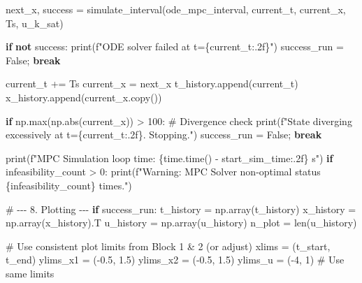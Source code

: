 \documentclass[
  letterpaper,
  DIV=11,
  numbers=noendperiod,
  oneside]{scrartcl}
\newenvironment{Shaded}{\begin{snugshade}}{\end{snugshade}}
\newcommand{\BuiltInTok}[1]{\textcolor[rgb]{0.00,0.23,0.31}{#1}}
\newcommand{\CommentTok}[1]{\textcolor[rgb]{0.37,0.37,0.37}{#1}}
\newcommand{\ControlFlowTok}[1]{\textcolor[rgb]{0.00,0.23,0.31}{\textbf{#1}}}
\newcommand{\DecValTok}[1]{\textcolor[rgb]{0.68,0.00,0.00}{#1}}
\newcommand{\FloatTok}[1]{\textcolor[rgb]{0.68,0.00,0.00}{#1}}
\newcommand{\KeywordTok}[1]{\textcolor[rgb]{0.00,0.23,0.31}{\textbf{#1}}}
\newcommand{\NormalTok}[1]{\textcolor[rgb]{0.00,0.23,0.31}{#1}}
\newcommand{\OperatorTok}[1]{\textcolor[rgb]{0.37,0.37,0.37}{#1}}
\newcommand{\SpecialCharTok}[1]{\textcolor[rgb]{0.37,0.37,0.37}{#1}}
\newcommand{\SpecialStringTok}[1]{\textcolor[rgb]{0.13,0.47,0.30}{#1}}
\newcommand{\VariableTok}[1]{\textcolor[rgb]{0.07,0.07,0.07}{#1}}
\begin{document}
\begin{Shaded}
\begin{Highlighting}[numbers=left,,]
\NormalTok{    next\_x, success }\OperatorTok{=}\NormalTok{ simulate\_interval(ode\_mpc\_interval, current\_t, current\_x, Ts, u\_k\_sat)}

    \ControlFlowTok{if} \KeywordTok{not}\NormalTok{ success:}
        \BuiltInTok{print}\NormalTok{(}\SpecialStringTok{f"ODE solver failed at t=}\SpecialCharTok{\{}\NormalTok{current\_t}\SpecialCharTok{:.2f\}}\SpecialStringTok{"}\NormalTok{)}
\NormalTok{        success\_run }\OperatorTok{=} \VariableTok{False}\OperatorTok{;} \ControlFlowTok{break}

\NormalTok{    current\_t }\OperatorTok{+=}\NormalTok{ Ts}
\NormalTok{    current\_x }\OperatorTok{=}\NormalTok{ next\_x}
\NormalTok{    t\_history.append(current\_t)}
\NormalTok{    x\_history.append(current\_x.copy())}

    \ControlFlowTok{if}\NormalTok{ np.}\BuiltInTok{max}\NormalTok{(np.}\BuiltInTok{abs}\NormalTok{(current\_x)) }\OperatorTok{\textgreater{}} \DecValTok{100}\NormalTok{: }\CommentTok{\# Divergence check}
        \BuiltInTok{print}\NormalTok{(}\SpecialStringTok{f"State diverging excessively at t=}\SpecialCharTok{\{}\NormalTok{current\_t}\SpecialCharTok{:.2f\}}\SpecialStringTok{. Stopping."}\NormalTok{)}
\NormalTok{        success\_run }\OperatorTok{=} \VariableTok{False}\OperatorTok{;} \ControlFlowTok{break}

\BuiltInTok{print}\NormalTok{(}\SpecialStringTok{f"MPC Simulation loop time: }\SpecialCharTok{\{}\NormalTok{time}\SpecialCharTok{.}\NormalTok{time() }\OperatorTok{{-}}\NormalTok{ start\_sim\_time}\SpecialCharTok{:.2f\}}\SpecialStringTok{ s"}\NormalTok{)}
\ControlFlowTok{if}\NormalTok{ infeasibility\_count }\OperatorTok{\textgreater{}} \DecValTok{0}\NormalTok{: }\BuiltInTok{print}\NormalTok{(}\SpecialStringTok{f"Warning: MPC Solver non{-}optimal status }\SpecialCharTok{\{}\NormalTok{infeasibility\_count}\SpecialCharTok{\}}\SpecialStringTok{ times."}\NormalTok{)}

\CommentTok{\# {-}{-}{-} 8. Plotting {-}{-}{-}}
\ControlFlowTok{if}\NormalTok{ success\_run:}
\NormalTok{    t\_history }\OperatorTok{=}\NormalTok{ np.array(t\_history)}
\NormalTok{    x\_history }\OperatorTok{=}\NormalTok{ np.array(x\_history).T}
\NormalTok{    u\_history }\OperatorTok{=}\NormalTok{ np.array(u\_history)}
\NormalTok{    n\_plot }\OperatorTok{=} \BuiltInTok{len}\NormalTok{(u\_history)}

    \CommentTok{\# Use consistent plot limits from Block 1 \& 2 (or adjust)}
\NormalTok{    xlims }\OperatorTok{=}\NormalTok{ (t\_start, t\_end)}
\NormalTok{    ylims\_x1 }\OperatorTok{=}\NormalTok{ (}\OperatorTok{{-}}\FloatTok{0.5}\NormalTok{, }\FloatTok{1.5}\NormalTok{)}
\NormalTok{    ylims\_x2 }\OperatorTok{=}\NormalTok{ (}\OperatorTok{{-}}\FloatTok{0.5}\NormalTok{, }\FloatTok{1.5}\NormalTok{)}
\NormalTok{    ylims\_u }\OperatorTok{=}\NormalTok{ (}\OperatorTok{{-}}\DecValTok{4}\NormalTok{, }\DecValTok{1}\NormalTok{) }\CommentTok{\# Use same limits}


\end{Highlighting}
\end{Shaded}
\end{document}

